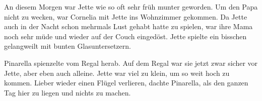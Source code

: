 
An diesem Morgen war Jette wie so oft sehr früh munter geworden. Um den Papa nicht zu wecken, war Cornelia mit Jette ins Wohnzimmer gekommen. Da Jette auch in der Nacht schon mehrmals Lust gehabt hatte zu spielen, war ihre Mama noch sehr müde und wieder auf der Couch eingedöst. Jette spielte ein bisschen gelangweilt mit bunten Glasuntersetzern. 

Pinarella spienzelte vom Regal herab.  Auf dem Regal war sie jetzt zwar sicher vor Jette, aber eben auch alleine. Jette war viel zu klein, um so weit hoch zu kommen. Lieber wieder einen Flügel verlieren, dachte Pinarella, als den ganzen Tag hier zu liegen und nichts zu machen.


